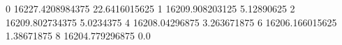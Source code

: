 0 16227.4208984375 22.6416015625
1 16209.908203125 5.12890625
2 16209.802734375 5.0234375
4 16208.04296875 3.263671875
6 16206.166015625 1.38671875
8 16204.779296875 0.0
